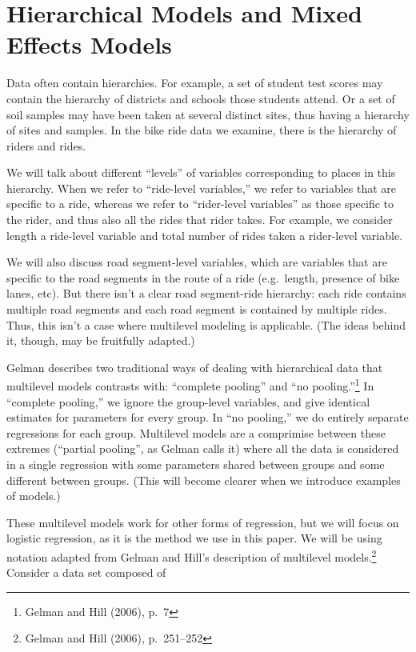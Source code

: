 \documentclass[12pt,twoside]{reedthesis}
\begin{document}
  \section{Hierarchical Models and Mixed Effects Models}\label{h-models}
  
  Data often contain hierarchies. For example, a set of student test
  scores may contain the hierarchy of districts and schools those students
  attend. Or a set of soil samples may have been taken at several distinct
  sites, thus having a hierarchy of sites and samples. In the bike ride
  data we examine, there is the hierarchy of riders and rides.
  
  We will talk about different ``levels'' of variables corresponding to
  places in this hierarchy. When we refer to ``ride-level variables,'' we
  refer to variables that are specific to a ride, whereas we refer to
  ``rider-level variables'' as those specific to the rider, and thus also
  all the rides that rider takes. For example, we consider length a
  ride-level variable and total number of rides taken a rider-level
  variable.
  
  We will also discuss road segment-level variables, which are variables
  that are specific to the road segments in the route of a ride
  (e.g.~length, presence of bike lanes, etc). But there isn't a clear road
  segment-ride hierarchy: each ride contains multiple road segments and
  each road segment is contained by multiple rides. Thus, this isn't a
  case where multilevel modeling is applicable. (The ideas behind it,
  though, may be fruitfully adapted.)
  
  Gelman describes two traditional ways of dealing with hierarchical data
  that multilevel models contrasts with: ``complete pooling'' and ``no
  pooling.''\footnote{Gelman and Hill (2006), p.~7} In ``complete
  pooling,'' we ignore the group-level variables, and give identical
  estimates for parameters for every group. In ``no pooling,'' we do
  entirely separate regressions for each group. Multilevel models are a
  comprimise between these extremes (``partial pooling'', as Gelman calls
  it) where all the data is considered in a single regression with some
  parameters shared between groups and some different between groups.
  (This will become clearer when we introduce examples of models.)
  
  These multilevel models work for other forms of regression, but we will
  focus on logistic regression, as it is the method we use in this paper.
  We will be using notation adapted from Gelman and Hill's description of
  multilevel models.\footnote{Gelman and Hill (2006), p.~251--252}
  Consider a data set composed of
  
\end{document}
